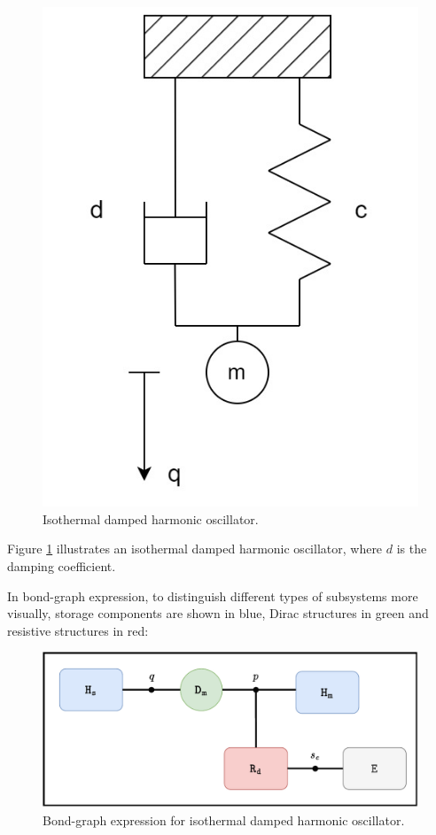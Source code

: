 \documentclass[
	parskip, 			   %
	twoside, 			   %
	DIV=14, 			   %
	BCOR=15.0mm, 		   %
	headsepline, 		   %
	open=right, 		   %
	captions=tableheading, %
	bibliography=totoc,    %
	numbers=noenddot       %
]{scrreprt}
\begin{document}
\clearpage
\begin{figure}[h!]
    \centering
    \includegraphics[scale=0.3]{figures/isothermal damped harmonic oscillator.jpg}
    \caption{Isothermal damped harmonic oscillator.}
    \label{fig:idho}
\end{figure}

Figure \ref{fig:idho} illustrates an isothermal damped harmonic oscillator, where $d$ is the damping coefficient.

In bond-graph expression, to distinguish different types of subsystems more visually, storage components are shown in blue, Dirac structures in green and resistive structures in red:

\begin{figure}[h!]
    \centering
    \includegraphics[scale=0.6]{figures/bondgraph_idho_exergetic.pdf}
    \caption{Bond-graph expression for isothermal damped harmonic oscillator.}
    \label{fig:bondgraph_idho}
\end{figure}
\end{document}
